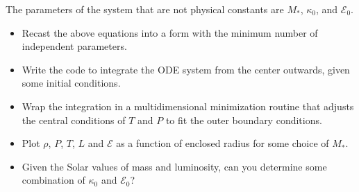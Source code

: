 \documentclass[11pt, preprint]{aastex}
\begin{document}
The parameters of the system that are not physical constants are
$M_\ast$, $\kappa_0$,  and $\mathcal{E}_0$.

\begin{itemize}
\item Recast the above equations into a form with the minimum number
  of independent parameters. 
\item Write the code to integrate the ODE system from the center
  outwards, given some initial conditions. 
\item Wrap the integration in a multidimensional minimization routine
  that adjusts the central conditions of $T$ and $P$ to fit the outer
  boundary conditions.
\item Plot $\rho$, $P$, $T$, $L$ and $\mathcal{E}$ as a function of
  enclosed radius for some choice of $M_\ast$.
\item Given the Solar values of mass and luminosity, can you determine
  some combination of $\kappa_0$ and $\mathcal{E}_0$?
\end{itemize}
\end{document}
